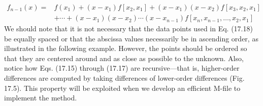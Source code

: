 \documentclass[../main.tex]{subfiles}
\begin{document}
\begin{equation}
    \tag{17.18}
    \begin{aligned}
    f_{n-1}(x)=& f\left(x_{1}\right)+\left(x-x_{1}\right) f\left[x_{2}, x_{1}\right]+\left(x-x_{1}\right)\left(x-x_{2}\right) f\left[x_{3}, x_{2}, x_{1}\right] \\
    &+\cdots+\left(x-x_{1}\right)\left(x-x_{2}\right) \cdots\left(x-x_{n-1}\right) f\left[x_{n}, x_{n-1}, \ldots, x_{2}, x_{1}\right]
    \end{aligned}
    \end{equation}
    We should note that it is not necessary that the data points used in Eq. (17.18) be
    equally spaced or that the abscissa values necessarily be in ascending order, as illustrated
    in the following example. However, the points should be ordered so that they are centered
    around and as close as possible to the unknown. Also, notice how Eqs. (17.15) through
    (17.17) are recursive—that is, higher-order differences are computed by taking differences
    of lower-order differences (Fig. 17.5). This property will be exploited when we develop an
    efficient M-file to implement the method.
\end{document}
